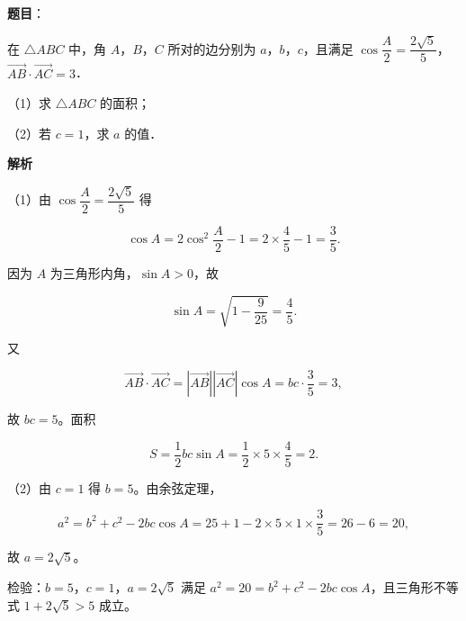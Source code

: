 \begin{answer}

\textbf{题目}：

在 $\triangle ABC$ 中，角 $A$，$B$，$C$ 所对的边分别为 $a$，$b$，$c$，且满足 $\cos\dfrac A2=\dfrac{2\sqrt5}{5}$，$\overrightarrow{AB}\cdot\overrightarrow{AC}=3$．

（1）求 $\triangle ABC$ 的面积；

（2）若 $c=1$，求 $a$ 的值．

\textbf{解析}

（1）由 $\cos\dfrac A2=\dfrac{2\sqrt5}{5}$ 得

\nopagebreak[4]
\[\cos A=2\cos^2\frac A2-1=2\times\frac45-1=\frac35.\]

因为 $A$ 为三角形内角，$\sin A>0$，故

\nopagebreak[4]
\[\sin A=\sqrt{1-\frac{9}{25}}=\frac45.\]

又

\nopagebreak[4]
\[\overrightarrow{AB}\cdot\overrightarrow{AC}
=|\overrightarrow{AB}||\overrightarrow{AC}|\cos A
=bc\cdot\frac35=3,\]

故 $bc=5$。面积

\nopagebreak[4]
\[S=\frac12bc\sin A=\frac12\times5\times\frac45=2.\]

（2）由 $c=1$ 得 $b=5$。由余弦定理，

\nopagebreak[4]
\[a^2=b^2+c^2-2bc\cos A
=25+1-2\times5\times1\times\frac35
=26-6=20,\]

故 $a=2\sqrt5$。

检验：$b=5$，$c=1$，$a=2\sqrt5$ 满足 $a^2=20=b^2+c^2-2bc\cos A$，且三角形不等式 $1+2\sqrt5>5$ 成立。


\end{answer}
